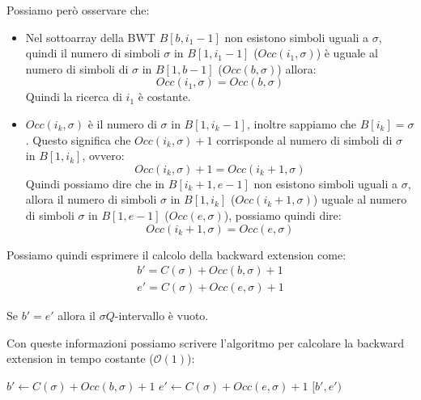 Possiamo però osservare che:
\begin{itemize}
    \item Nel sottoarray della BWT $B[b, i_1 - 1]$ non esistono simboli uguali a
          $\sigma$, quindi il numero di simboli $\sigma$ in $B[1, i_1 - 1]$
          ($Occ(i_1, \sigma)$) è uguale al numero di simboli di $\sigma$ in
          $B[1, b - 1]$ ($Occ(b,\sigma)$) allora:
          \begin{equation}
              Occ(i_1,\sigma) = Occ(b,\sigma)
          \end{equation}
          Quindi la ricerca di $i_1$ è costante.
    \item $Occ(i_k, \sigma)$ è il numero di $\sigma$ in $B[1, i_k - 1]$, inoltre
          sappiamo che $B[i_k] = \sigma$. Questo significa che $Occ(i_k, \sigma)
              + 1$ corrisponde al numero di simboli di $\sigma$ in $B[1, i_k]$,
          ovvero:
          \begin{equation}
              Occ(i_k, \sigma) + 1 = Occ(i_k + 1, \sigma)
          \end{equation}
          Quindi possiamo dire che in $B[i_k + 1, e - 1]$ non esistono simboli
          uguali a $\sigma$, allora il numero di simboli $\sigma$ in $B[1, i_k]$
          ($Occ(i_k + 1, \sigma)$) uguale al numero di simboli $\sigma$ in
          $B[1, e - 1]$ ($Occ(e, \sigma)$), possiamo quindi dire:
          \begin{equation}
              Occ(i_k + 1, \sigma) = Occ(e, \sigma)
          \end{equation}
\end{itemize}
Possiamo quindi esprimere il calcolo della backward extension come:
\begin{equation}
    \begin{array}{c}
        b' = C(\sigma) + Occ(b, \sigma) + 1 \\
        e' = C(\sigma) + Occ(e, \sigma) + 1
    \end{array}
\end{equation}
\begin{nota}
    Se $b' = e'$ allora il $\sigma Q$-intervallo è vuoto.
\end{nota}
Con queste informazioni possiamo scrivere l'algoritmo per calcolare la backward
extension in tempo costante ($\mathcal{O}(1)$):
\begin{algorithm}
    \begin{algorithmic}
        \State $b' \gets C(\sigma) + Occ(b, \sigma) + 1$
        \State $e' \gets C(\sigma) + Occ(e, \sigma) + 1$
        \State \Return $[b', e')$
        \EndFunction
    \end{algorithmic}
\end{algorithm}
